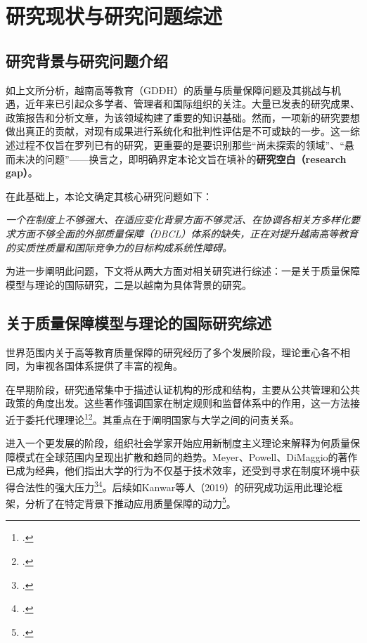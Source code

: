 

\section{研究现状与研究问题综述}
\label{sec:tong_quan_nghien_cuu}

\subsection{研究背景与研究问题介绍}

如上文所分析，越南高等教育（GDĐH）的质量与质量保障问题及其挑战与机遇，近年来已引起众多学者、管理者和国际组织的关注。大量已发表的研究成果、政策报告和分析文章，为该领域构建了重要的知识基础。然而，一项新的研究要想做出真正的贡献，对现有成果进行系统化和批判性评估是不可或缺的一步。这一综述过程不仅旨在罗列已有的研究，更重要的是要识别那些“尚未探索的领域”、“悬而未决的问题”——换言之，即明确界定本论文旨在填补的\textbf{研究空白（research gap）}。

在此基础上，本论文确定其核心研究问题如下：

\begin{center}
\textit{一个在制度上不够强大、在适应变化背景方面不够灵活、在协调各相关方多样化要求方面不够全面的外部质量保障（ĐBCL）体系的缺失，正在对提升越南高等教育的实质性质量和国际竞争力的目标构成系统性障碍。}
\end{center}

为进一步阐明此问题，下文将从两大方面对相关研究进行综述：一是关于质量保障模型与理论的国际研究，二是以越南为具体背景的研究。

\subsection{关于质量保障模型与理论的国际研究综述}

世界范围内关于高等教育质量保障的研究经历了多个发展阶段，理论重心各不相同，为审视各国体系提供了丰富的视角。

在早期阶段，研究通常集中于描述认证机构的形成和结构，主要从公共管理和公共政策的角度出发。这些著作强调国家在制定规则和监督体系中的作用，这一方法接近于委托代理理论\footcite{Kivisto2008}\footcite{DeBoer2019}。其重点在于阐明国家与大学之间的问责关系。

进入一个更发展的阶段，组织社会学家开始应用新制度主义理论来解释为何质量保障模式在全球范围内呈现出扩散和趋同的趋势。Meyer、Powell、DiMaggio的著作已成为经典，他们指出大学的行为不仅基于技术效率，还受到寻求在制度环境中获得合法性的强大压力\footcite{MeyerPowell2020}\footcite{DiMaggioPowell1983}。后续如Kanwar等人（2019）的研究成功运用此理论框架，分析了在特定背景下推动应用质量保障的动力\footcite{Kanwar2019}。

